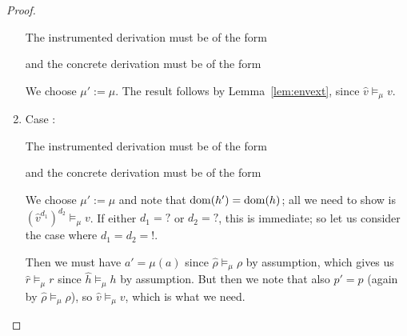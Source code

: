 \documentclass{article}
\begin{document}
\begin{proof}
\begin{enumerate}
  The instrumented derivation must be of the form

  \begin{prooftree}
     
     
  \end{prooftree}


  and the concrete derivation must be of the form

  \begin{prooftree}
     
  \end{prooftree}

  We choose $\mu':=\mu$. The result follows by Lemma~\ref{lem:envext}, since $\hat{v}\models_{\mu}v$.

\item Case :

  The instrumented derivation must be of the form

  \begin{prooftree}
     
  \end{prooftree}

  and the concrete derivation must be of the form

  \begin{prooftree}
  \end{prooftree}

  We choose $\mu':=\mu$ and note that $\dom(h')=\dom(h)$; all we need to show is $(\hat{v}^{d_1})^{d_2}\models_{\mu}v$. If either $d_1=?$ or $d_2=?$, this is immediate; so let us consider the case where $d_1=d_2=!$.

  Then we must have $a'=\mu(a)$ since $\hat{\rho}\models_{\mu}\rho$ by assumption, which gives us $\hat{r}\models_{\mu}r$ since $\hat{h}\models_{\mu}h$ by assumption. But then we note that also $p'=p$ (again by $\hat{\rho}\models_{\mu}\rho$), so $\hat{v}\models_{\mu}v$, which is what we need.


\end{enumerate}
\end{proof}
\end{document}
